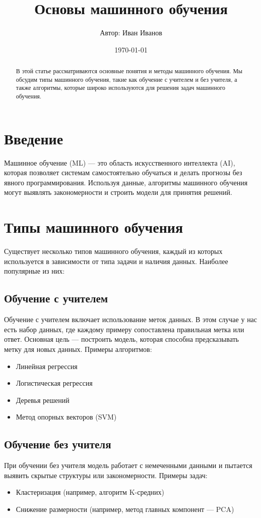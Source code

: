 \documentclass[a4paper,12pt]{article}
\title{Основы машинного обучения}
\author{Автор: Иван Иванов}
\date{\today}
\begin{document}
\maketitle

\begin{abstract}
    В этой статье рассматриваются основные понятия и методы машинного обучения. Мы обсудим типы машинного обучения, такие как обучение с учителем и без учителя, а также алгоритмы, которые широко используются для решения задач машинного обучения.
\end{abstract}

\section{Введение}
Машинное обучение (ML) — это область искусственного интеллекта (AI), которая позволяет системам самостоятельно обучаться и делать прогнозы без явного программирования. Используя данные, алгоритмы машинного обучения могут выявлять закономерности и строить модели для принятия решений.

\section{Типы машинного обучения}

Существует несколько типов машинного обучения, каждый из которых используется в зависимости от типа задачи и наличия данных. Наиболее популярные из них:

\subsection{Обучение с учителем}
Обучение с учителем включает использование меток данных. В этом случае у нас есть набор данных, где каждому примеру сопоставлена правильная метка или ответ. Основная цель — построить модель, которая способна предсказывать метку для новых данных. Примеры алгоритмов:
\begin{itemize}
    \item Линейная регрессия
    \item Логистическая регрессия
    \item Деревья решений
    \item Метод опорных векторов (SVM)
\end{itemize}

\subsection{Обучение без учителя}
При обучении без учителя модель работает с немеченными данными и пытается выявить скрытые структуры или закономерности. Примеры задач:
\begin{itemize}
    \item Кластеризация (например, алгоритм K-средних)
    \item Снижение размерности (например, метод главных компонент — PCA)
\end{itemize}
\end{document}
